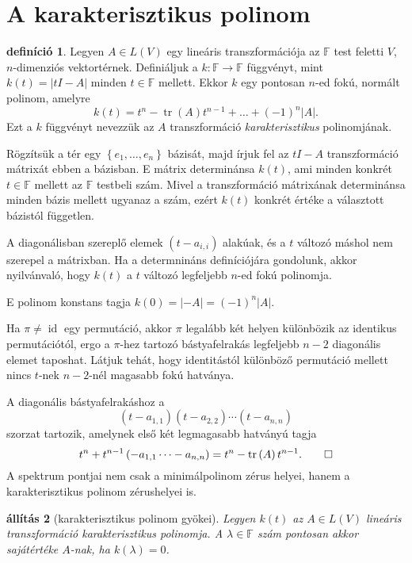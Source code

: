 \documentclass[9pt, a4paper, showtrims]{memoir}
\makeatletter
\renewenvironment{proof}[1][\proofname]
    {\par\pushQED{\qed}%
    \normalfont \topsep6\p@\@plus6\p@\relax
    \trivlist
    \item[\hskip\labelsep
        \itshape
    #1\@addpunct{:}]\ignorespaces}
    {\popQED\endtrivlist\@endpefalse}
\theoremstyle{plain}
\newtheorem{proposition}{állítás}[chapter]
\theoremstyle{remark}
\theoremstyle{definition}
\newtheorem{definition}[proposition]{definíció}
\DeclareMathOperator{\tr}{tr}
\DeclareMathOperator{\id}{id}
\makeatother
\begin{document}
\section{A karakterisztikus polinom}
\begin{definition}
	Legyen $A\in L\left( V \right)$ egy lineáris transzformációja az $\mathbb{F}$ test feletti $V$,
	$n$-dimenziós vektortérnek.
	Definiáljuk a $k:\mathbb{F}\to\mathbb{F}$ függvényt, mint
	$k\left( t \right)=|tI-A|$ minden $t\in\mathbb{F}$ mellett.
	Ekkor $k$ egy pontosan $n$-ed fokú, normált polinom,
	amelyre
	\[
		k\left( t \right)
		=
		t^n-\tr(A)t^{n-1}+\dots+\left( -1 \right)^n|A|.
	\]
	Ezt a $k$ függvényt nevezzük az
	$A$ transzformáció \emph{karakterisztikus}
	polinomjának.
\end{definition}
\begin{proof}
	Rögzítsük a tér egy $\left\{ e_1,\ldots,e_n \right\}$ bázisát,
	majd írjuk fel az $tI-A$ transzformáció mátrixát ebben a bázisban.
	E mátrix determinánsa $k\left( t \right)$,
	ami minden konkrét $t\in\mathbb{F}$ mellett az $\mathbb{F}$ testbeli szám.
	Mivel a transzformáció mátrixának determinánsa minden bázis mellett ugyanaz a szám,
	ezért $k\left( t \right)$ konkrét értéke a választott bázistól független.

	A diagonálisban szereplő elemek $\left( t-a_{i,i} \right)$ alakúak,
	és a $t$ változó máshol nem szerepel a mátrixban.
	Ha a determnináns definíciójára gondolunk, akkor nyilvánvaló, hogy $k\left( t \right)$ a $t$
	változó legfeljebb $n$-ed fokú polinomja.

	E polinom konstans tagja $k\left( 0 \right)=|-A|=\left( -1 \right)^n|A|.$

	Ha $\pi\neq\id$ egy permutáció,
	akkor $\pi$ legalább két helyen különbözik az identikus permutációtól,
	ergo a $\pi$-hez tartozó bástyafelrakás legfeljebb $n-2$ diagonális elemet taposhat.
	Látjuk tehát,
	hogy identitástól különböző permutáció mellett nincs $t$-nek $n-2$-nél magasabb fokú hatványa.

	A diagonális bástyafelrakáshoz a
	\[
		\left( t-a_{1,1} \right)\left( t-a_{2,2} \right)\cdots\left( t-a_{n,n} \right)
	\]
	szorzat tartozik, amelynek első két legmagasabb hatványú tagja
	\[
		t^n+t^{n-1}\left( -a_{1,1}\dots-a_{n,n} \right)=t^n-\tr\left( A \right)t^{n-1}.\qedhere
	\]
\end{proof}
A spektrum pontjai nem csak a minimálpolinom zérus helyei,
hanem a karakterisztikus polinom zérushelyei is.
\begin{proposition}[karakterisztikus polinom gyökei]
	Legyen $k\left( t \right)$ az $A\in L\left( V \right)$ lineáris transzformáció karakterisztikus polinomja.
	A $\lambda\in\mathbb{F}$ szám pontosan akkor sajátértéke $A$-nak,
	ha $k\left( \lambda \right)=0$.
\end{proposition}
\end{document}
